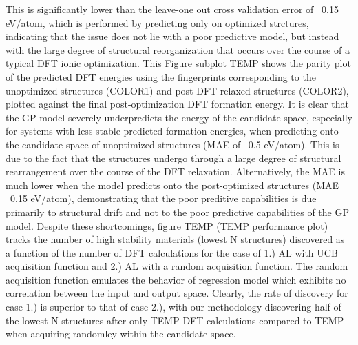 %
This is significantly lower than the leave-one out cross validation error of ~0.15 eV/atom, which is performed by predicting only on optimized strctures, indicating that the issue does not lie with a poor predictive model, but instead with the large degree of structural reorganization that occurs over the course of a typical DFT ionic optimization.
%
This
%
Figure subplot TEMP shows the parity plot of the predicted DFT energies using the fingerprints corresponding to the unoptimized structures (COLOR1) and post-DFT relaxed structures (COLOR2),
plotted against the final post-optimization DFT formation energy.
It is clear that the GP model severely underpredicts the energy of the candidate space, especially for systems with less stable predicted formation energies, when predicting onto the candidate space of unoptimized structures (MAE of ~0.5 eV/atom).
%
This is due to the fact that the structures undergo through a large degree of structural rearrangement over the course of the DFT relaxation.
%
Alternatively, the MAE is much lower when the model predicts onto the post-optimized structures (MAE ~0.15 eV/atom),
demonstrating that the poor preditive capabilities is due primarily to structural drift and not to the poor predictive capabilities of the GP model.
%
Despite these shortcomings, figure TEMP (TEMP performance plot) tracks the number of high stability materials (lowest N structures) discovered as a function of the number of DFT calculations for the case of 1.) AL with UCB acquisition function and 2.) AL with a random acquisition function.
%
The random acquisition function emulates the behavior of regression model which exhibits no correlation between the input and output space.
%
Clearly, the rate of discovery for case 1.) is superior to that of case 2.), with our methodology discovering half of the lowest N structures after only TEMP DFT calculations compared to TEMP when acquiring randomley within the candidate space.



